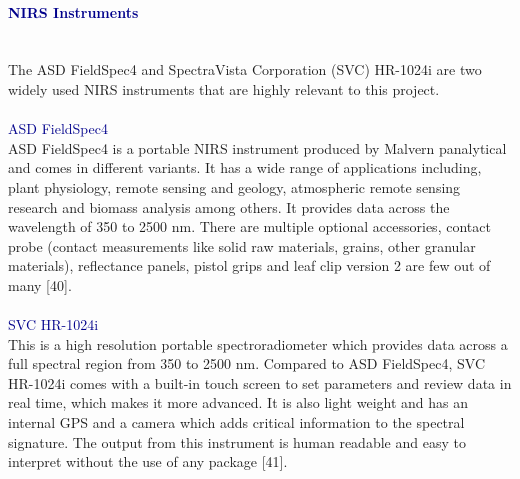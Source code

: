 \documentclass[12pt,a4paper]{article}
\begin{document}
\paragraph{\textbf{\textcolor{darkblue}{NIRS Instruments}}}\\
The ASD FieldSpec4 and SpectraVista Corporation (SVC) HR-1024i are two widely used NIRS instruments that are highly relevant to this project. \\
\\
\textcolor{darkblue}{ASD FieldSpec4}\\
ASD FieldSpec4 is a portable NIRS instrument produced by  Malvern panalytical and comes in different variants. It has a wide range of applications including, plant physiology, remote sensing and geology, atmospheric remote sensing research and biomass analysis among others. It provides data across the wavelength of 350 to 2500 nm. There are multiple optional accessories, contact probe (contact measurements like solid raw materials, grains, other granular materials), reflectance panels, pistol grips and leaf clip version 2 are few out of many [40]. \\
\\
\textcolor{darkblue}{SVC HR-1024i}\\
This is a high resolution portable spectroradiometer which provides data across a full spectral region from 350 to 2500 nm. Compared to ASD FieldSpec4, SVC HR-1024i comes with a built-in touch screen to set parameters and review data in real time, which makes it more advanced. It is also light weight and has an internal GPS and a camera which adds critical information to the spectral signature. The output from this instrument is human readable and easy to interpret without the use of any package [41]. \\
\end{document}
